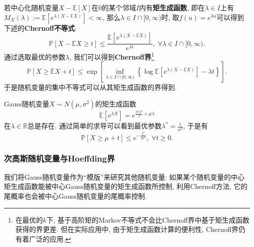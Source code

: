 若中心化随机变量$X - \mathbb{E}[X]$在$0$的某个邻域$I$内有\textbf{矩生成函数}, 即在$\lambda \in I$上有$M_X(\lambda) := \mathbb{E}[e^{\lambda (X - \mathbb{E}X)}] < \infty$, 那么$\lambda \in I \cap [0, \infty)$时, 取$f(u) = e^{\lambda u}$可以得到下述的\textbf{Chernoff不等式}: 
\begin{equation*}
	\mathbb{P}[X - \mathbb{E}X \geq t] 
	\leq \frac{\mathbb{E}[e^{\lambda(X - \mathbb{E}X)}]}{e^{\lambda t}},\;
	\forall \lambda \in I \cap [0, \infty).
\end{equation*}
通过选取最优的参数$\lambda$, 我们可以得到\textbf{Chernoff界}\footnote{在最优的$k$下, 基于高阶矩的Markov不等式不会比Chernoff界中基于矩生成函数获得的界更差. 但在实际应用中, 由于矩生成函数计算的便利性, Chernoff界仍有着广泛的应用.}
\begin{equation*}
	\mathbb{P}[X \geq \mathbb{E}X + t]
	\leq \exp \left[ \inf_{\lambda \in I \cap [0, \infty)} \left\{ \log \mathbb{E}[e^{\lambda(X - \mathbb{E}X)}] - \lambda t \right\} \right]. 
\end{equation*}
于是随机变量的集中不等式可以从其矩生成函数的界得到. 

\begin{example}[Gauss随机变量的上偏差不等式]
	Gauss随机变量$X \sim N(\mu, \sigma^2)$的矩生成函数
	\begin{equation}
		\mathbb{E}[e^{\lambda X}] = e^{\frac{\sigma^2 \lambda^2}{2} + \mu \lambda} 		
	\end{equation}
	在$\lambda \in \mathbb{R}$总是存在. 
	通过简单的求导可以看到最优参数$\lambda^* = \frac{t}{\sigma^2}$, 于是有
	\begin{equation}\label{eq:UpperDeviationOfSubGuassianRV}
		\mathbb{P}[X \geq \mu + t] \leq e^{- \frac{t^2}{2 \sigma^2}},\; \forall t \geq 0. 
	\end{equation}
\end{example}

\subsubsection{次高斯随机变量与Hoeffding界}

我们将Gauss随机变量作为“模版”来研究其他随机变量: 如果某个随机变量的中心矩生成函数能被中心Gauss随机变量的矩生成函数所控制, 利用Chernoff方法, 它的尾概率也会被中心Gauss随机变量的尾概率控制. 

